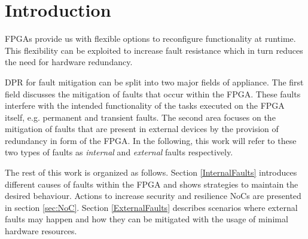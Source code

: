 \tableofcontents

\section{Introduction}\label{Introduction}
\glspl{FPGA} provide us with flexible options to reconfigure functionality at runtime. 
This flexibility can be exploited to increase fault resistance which in turn reduces the need for hardware redundancy. 

\gls{DPR} for fault mitigation can be split into two major fields of appliance. 
The first field discusses the mitigation of faults that occur within the \gls{FPGA}.
These faults interfere with the intended functionality of the tasks executed on the \gls{FPGA} itself, e.g. permanent and transient faults. 
The second area focuses on the mitigation of faults that are present in external devices by the provision of redundancy in form of the \gls{FPGA}.
In the following, this work will refer to these two types of faults as \textit{internal} and \textit{external} faults respectively.

The rest of this work is organized as follows.
Section \ref{InternalFaults} introduces different causes of faults within the \gls{FPGA} and shows strategies to maintain the desired behaviour.
Actions to increase security and resilience \glspl{NoC} are presented in section \ref{sec:NoC}.
Section \ref{ExternalFaults} describes scenarios where external faults may happen and how they can be mitigated with the usage of minimal hardware resources. 
